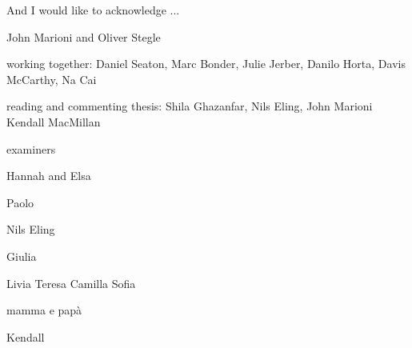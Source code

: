 
\begin{acknowledgements}      


And I would like to acknowledge ...

John Marioni and Oliver Stegle

working together: Daniel Seaton, Marc Bonder, Julie Jerber, Danilo Horta, Davis McCarthy, Na Cai

reading and commenting thesis: Shila Ghazanfar, Nils Eling,
John Marioni
Kendall MacMillan

examiners

Hannah and Elsa

Paolo

Nils Eling

Giulia

Livia Teresa Camilla Sofia 

mamma e papà

Kendall

\end{acknowledgements}
